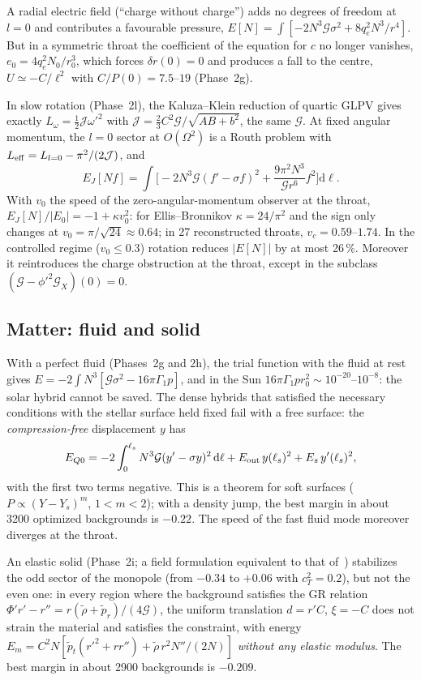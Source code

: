\documentclass[11pt,a4paper]{article}
\theoremstyle{remark}
\newcommand{\G}{\mathcal G}
\newcommand{\dd}{\mathrm d}
\begin{document}
A radial electric field (``charge without charge'') adds no degrees of freedom at $l=0$ and contributes a favourable pressure, $E[N]=\int[-2N^3\G\sigma^2+8q_e^2N^3/r^4]$. But in a symmetric throat the coefficient of the equation for $c$ no longer vanishes, $e_0=4q_e^2N_0/r_0^3$, which forces $\delta r(0)=0$ and produces a fall to the centre, $U\simeq-C/\ell^2$ with $C/P(0)=7.5$--$19$ (Phase~2g).

In slow rotation (Phase~2l), the Kaluza--Klein reduction of quartic GLPV gives exactly $L_\omega=\tfrac12\mathcal J\omega'^2$ with $\mathcal J=\tfrac23C^2\G/\sqrt{AB+b^2}$, the same $\G$. At fixed angular momentum, the $l=0$ sector at $O(\Omega^2)$ is a Routh problem with $L_{\rm eff}=L_{l=0}-\pi^2/(2\mathcal J)$, and
\begin{equation}
E_J[Nf]=\int\Big[-2N^3\G(f'-\sigma f)^2+\frac{9\pi^2N^3}{\G r^6}f^2\Big]\dd\ell .
\end{equation}
With $v_0$ the speed of the zero-angular-momentum observer at the throat, $E_J[N]/|E_0|=-1+\kappa v_0^2$: for Ellis--Bronnikov $\kappa=24/\pi^2$ and the sign only changes at $v_0=\pi/\sqrt{24}\approx0.64$; in 27 reconstructed throats, $v_c=0.59$--$1.74$. In the controlled regime ($v_0\le0.3$) rotation reduces $|E[N]|$ by at most 26\,\%. Moreover it reintroduces the charge obstruction at the throat, except in the subclass $(\G-\phi'^2\G_X)(0)=0$.

\subsection{Matter: fluid and solid}

With a perfect fluid (Phases~2g and 2h), the trial function with the fluid at rest gives $E=-2\int N^3[\G\sigma^2-16\pi\Gamma_1p]$, and in the Sun $16\pi\Gamma_1pr_0^2\sim10^{-20}$--$10^{-8}$: the solar hybrid cannot be saved. The dense hybrids that satisfied the necessary conditions with the stellar surface held fixed fail with a free surface: the \emph{compression-free} displacement $y$ has
\begin{equation}
E_{Q0}=-2\int_0^{\ell_s}N^3\G(y'-\sigma y)^2\,\dd\ell+E_{\rm out}\,y(\ell_s)^2+E_s\,y'(\ell_s)^2 ,
\end{equation}
with the first two terms negative. This is a theorem for soft surfaces ($P\propto(Y-Y_s)^m$, $1<m<2$); with a density jump, the best margin in about 3200 optimized backgrounds is $-0.22$. The speed of the fast fluid mode moreover diverges at the throat.

An elastic solid (Phase~2i; a field formulation equivalent to that of~\cite{KarloviniSamuelsson}) stabilizes the odd sector of the monopole (from $-0.34$ to $+0.06$ with $c_T^2=0.2$), but not the even one: in every region where the background satisfies the GR relation $\Phi'r'-r''=r(\tilde\rho+\tilde p_r)/(4\G)$, the uniform translation $d=r'C$, $\xi=-C$ does not strain the material and satisfies the constraint, with energy
$E_m=C^2N[\tilde p_t(r'^2+rr'')+\tilde\rho\,r^2N''/(2N)]$ \emph{without any elastic modulus}. The best margin in about 2900 backgrounds is $-0.209$.
\end{document}
